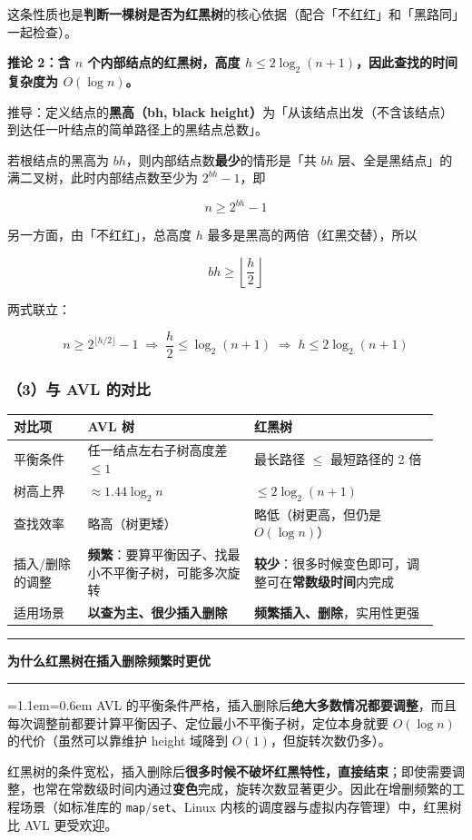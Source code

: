 \documentclass[11pt,openany,UTF8]{ctexbook}
\newcommand{\callouthead}[2]{%
  \par\addvspace{7pt}\noindent
  {\color{#1}\rule[-0.15em]{3pt}{1.05em}}\hspace{0.5em}%
  {\bfseries\color{#1}#2}\par\nobreak\vspace{-0.35em}%
  {\color{rulesep}\hrule height 0.4pt}\nobreak\vspace{0.45em}%
  \begingroup\small\setlength{\parindent}{0pt}%
  \leftskip=1.1em\rightskip=0.6em\noindent\ignorespaces}
\newcommand{\calloutend}{\par\endgroup\addvspace{7pt}}
\newenvironment{callkey}[1]{\callouthead{keybar}{#1}}{\calloutend}
\begin{document}
这条性质也是\textbf{判断一棵树是否为红黑树}的核心依据（配合「不红红」和「黑路同」一起检查）。

\textbf{推论 2：含 $n$ 个内部结点的红黑树，高度 $h\le 2\log_2(n+1)$，因此查找的时间复杂度为 $O(\log n)$。}

推导：定义结点的\textbf{黑高（bh, black height）}为「从该结点出发（不含该结点）到达任一叶结点的简单路径上的黑结点总数」。

若根结点的黑高为 $bh$，则内部结点数\textbf{最少}的情形是「共 $bh$ 层、全是黑结点」的满二叉树，此时内部结点数至少为 $2^{bh}-1$，即

\[n\ge 2^{bh}-1\]

另一方面，由「不红红」，总高度 $h$ 最多是黑高的两倍（红黑交替），所以

\[bh\ge \left\lfloor\frac{h}{2}\right\rfloor\]

两式联立：

\[n\ge 2^{\lfloor h/2\rfloor}-1\;\Longrightarrow\;\frac{h}{2}\le \log_2(n+1)\;\Longrightarrow\;\boxed{h\le 2\log_2(n+1)}\]

\subsubsection{（3）与 AVL 的对比}

\begingroup\small\setlength{\tabcolsep}{4.0pt}
\begin{longtable}{@{}L{0.1628\linewidth}L{0.3618\linewidth}L{0.4040\linewidth}@{}}
\toprule
\textbf{对比项} & \textbf{AVL 树} & \textbf{红黑树} \\
\midrule
\endhead
平衡条件 & 任一结点左右子树高度差 $\le 1$ & 最长路径 $\le$ 最短路径的 2 倍 \\
树高上界 & $\approx 1.44\log_2 n$ & $\le 2\log_2(n+1)$ \\
查找效率 & 略高（树更矮） & 略低（树更高，但仍是 $O(\log n)$） \\
插入/删除的调整 & \textbf{频繁}：要算平衡因子、找最小不平衡子树，可能多次旋转 & \textbf{较少}：很多时候变色即可，调整可在\textbf{常数级时间}内完成 \\
适用场景 & \textbf{以查为主、很少插入删除} & \textbf{频繁插入、删除}，实用性更强 \\
\bottomrule
\end{longtable}
\endgroup

\begin{callkey}{为什么红黑树在插入删除频繁时更优}
AVL 的平衡条件严格，插入删除后\textbf{绝大多数情况都要调整}，而且每次调整前都要计算平衡因子、定位最小不平衡子树，定位本身就要 $O(\log n)$ 的代价（虽然可以靠维护 height 域降到 $O(1)$，但旋转次数仍多）。

红黑树的条件宽松，插入删除后\textbf{很多时候不破坏红黑特性，直接结束}；即使需要调整，也常在常数级时间内通过\textbf{变色}完成，旋转次数显著更少。因此在增删频繁的工程场景（如标准库的 \texttt{map}/\texttt{set}、Linux 内核的调度器与虚拟内存管理）中，红黑树比 AVL 更受欢迎。

\end{callkey}
\end{document}
